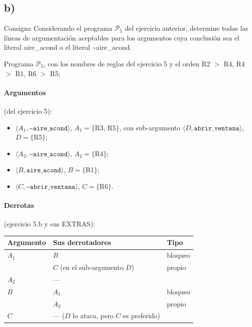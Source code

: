 \documentclass[11pt,a4paper]{article}
\newcommand{\nf}{\textasciitilde}                 %
\begin{document}
\subsection{b)}

\begin{enunciado}{Consigna}
Considerando el programa $\mathcal{P}_5$ del ejercicio anterior, determine todas las líneas de argumentación aceptables para los argumentos cuya conclusión sea el literal aire\_acond o el literal \nf aire\_acond.
\end{enunciado}

Programa $\mathcal{P}_5$, con los nombres de reglas del ejercicio 5 y el orden R2 $>$ R4, R4 $>$ R1, R6 $>$ R5:
\programaPcinco
\reglasPcinco

\paragraph{Argumentos} (del ejercicio 5):
\begin{itemize}
  \item $\langle A_1, \texttt{\nf aire\_acond}\rangle$, $A_1 = \{$R3, R5$\}$, con sub-argumento $\langle D, \texttt{abrir\_ventana}\rangle$, $D = \{$R5$\}$;
  \item $\langle A_2, \texttt{\nf aire\_acond}\rangle$, $A_2 = \{$R4$\}$;
  \item $\langle B, \texttt{aire\_acond}\rangle$, $B = \{$R1$\}$;
  \item $\langle C, \texttt{\nf abrir\_ventana}\rangle$, $C = \{$R6$\}$.
\end{itemize}

\paragraph{Derrotas} (ejercicio 5.b y sus EXTRAS):
\begin{center}
\small
\begin{tabular}{@{}l l l@{}}
\toprule
\textbf{Argumento} & \textbf{Sus derrotadores} & \textbf{Tipo} \\
\midrule
$A_1$ & $B$ & bloqueo \\
 & $C$ (en el sub-argumento $D$) & propio \\
$A_2$ & --- & \\
$B$ & $A_1$ & bloqueo \\
 & $A_2$ & propio \\
$C$ & --- ($D$ lo ataca, pero $C$ es preferido) & \\
\bottomrule
\end{tabular}
\end{center}
\end{document}
